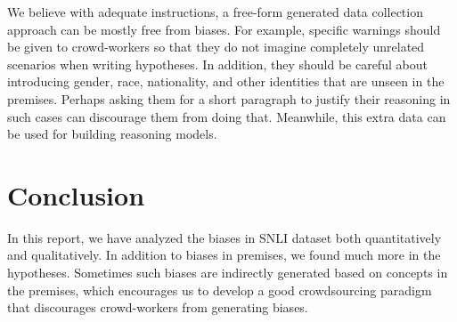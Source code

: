 \documentclass[11pt]{article}
\begin{document}
    We believe with adequate instructions, a free-form generated data collection approach can be mostly free from
    biases.
    For example, specific warnings should be given to crowd-workers so that they do not imagine completely unrelated
    scenarios when writing hypotheses.
    In addition, they should be careful about introducing gender, race, nationality, and other identities that are
    unseen in the premises.
    Perhaps asking them for a short paragraph to justify their reasoning in such cases can discourage them from doing
    that.
    Meanwhile, this extra data can be used for building reasoning models.


    \section{Conclusion}

    In this report, we have analyzed the biases in SNLI dataset both quantitatively and qualitatively.
    In addition to biases in premises, we found much more in the hypotheses.
    Sometimes such biases are indirectly generated based on concepts in the premises, which encourages us to develop
    a good crowdsourcing paradigm that discourages crowd-workers from generating biases.

    \clearpage
    
    



\end{document}
